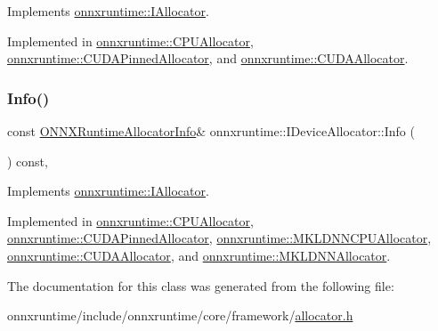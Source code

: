Implements \mbox{\hyperlink{classonnxruntime_1_1IAllocator_aeab273380d08b613b584c9e50deeb5f9}{onnxruntime\+::\+I\+Allocator}}.



Implemented in \mbox{\hyperlink{classonnxruntime_1_1CPUAllocator_affe0e58d7fc048fb2cef9fc6704fdd91}{onnxruntime\+::\+C\+P\+U\+Allocator}}, \mbox{\hyperlink{classonnxruntime_1_1CUDAPinnedAllocator_a2d28c8305e862060b9e5337073cda109}{onnxruntime\+::\+C\+U\+D\+A\+Pinned\+Allocator}}, and \mbox{\hyperlink{classonnxruntime_1_1CUDAAllocator_a72082fdae56347fdc45d4a3ac0f1e498}{onnxruntime\+::\+C\+U\+D\+A\+Allocator}}.

\mbox{\label{classonnxruntime_1_1IDeviceAllocator_a46b848cd863bcd50d1e63d48ad96c63c}} 
\subsubsection{\texorpdfstring{Info()}{Info()}}
{\footnotesize\ttfamily const \mbox{\hyperlink{structONNXRuntimeAllocatorInfo}{O\+N\+N\+X\+Runtime\+Allocator\+Info}}\& onnxruntime\+::\+I\+Device\+Allocator\+::\+Info (\begin{DoxyParamCaption}{ }\end{DoxyParamCaption}) const\hspace{0.3cm}{\ttfamily [override]}, {}}



Implements \mbox{\hyperlink{classonnxruntime_1_1IAllocator_a384b9f03d2346999b7b9ce3b225982a3}{onnxruntime\+::\+I\+Allocator}}.



Implemented in \mbox{\hyperlink{classonnxruntime_1_1CPUAllocator_a5eda291e0b728ea21d1f6893b5108020}{onnxruntime\+::\+C\+P\+U\+Allocator}}, \mbox{\hyperlink{classonnxruntime_1_1CUDAPinnedAllocator_af08d82e6f7b890059386326ac371950a}{onnxruntime\+::\+C\+U\+D\+A\+Pinned\+Allocator}}, \mbox{\hyperlink{classonnxruntime_1_1MKLDNNCPUAllocator_ab5ed702febdae0ac4d7d6f17c3534cc7}{onnxruntime\+::\+M\+K\+L\+D\+N\+N\+C\+P\+U\+Allocator}}, \mbox{\hyperlink{classonnxruntime_1_1CUDAAllocator_a347f391c14e4466bce42915feefa1f2f}{onnxruntime\+::\+C\+U\+D\+A\+Allocator}}, and \mbox{\hyperlink{classonnxruntime_1_1MKLDNNAllocator_ad8e51ea2f30a5bf719c47b5d96de41c1}{onnxruntime\+::\+M\+K\+L\+D\+N\+N\+Allocator}}.



The documentation for this class was generated from the following file\+:\begin{DoxyCompactItemize}
\item 
onnxruntime/include/onnxruntime/core/framework/\mbox{\hyperlink{framework_2allocator_8h}{allocator.\+h}}\end{DoxyCompactItemize}
